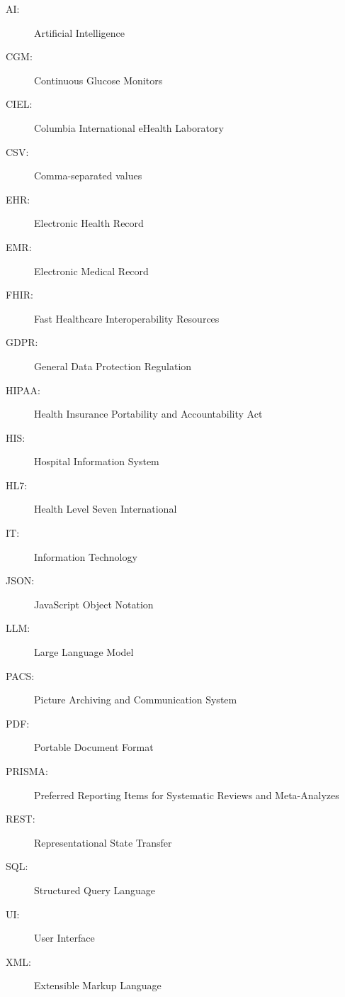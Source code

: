 \begin{description}
    \item[AI:] Artificial Intelligence
    \item[CGM:] Continuous Glucose Monitors
    \item[CIEL:] Columbia International eHealth Laboratory
    \item[CSV:] Comma-separated values 
    \item[EHR:] Electronic Health Record
    \item[EMR:] Electronic Medical Record
    \item[FHIR:] Fast Healthcare Interoperability Resources
    \item[GDPR:] General Data Protection Regulation
    \item[HIPAA:] Health Insurance Portability and Accountability Act
    \item[HIS:] Hospital Information System
    \item[HL7:] Health Level Seven International
    \item[IT:] Information Technology
    \item[JSON:] JavaScript Object Notation
    \item[LLM:] Large Language Model
    \item[PACS:] Picture Archiving and Communication System
    \item[PDF:] Portable Document Format 
    \item[PRISMA:] Preferred Reporting Items for Systematic Reviews and Meta-Analyzes
    \item[REST:] Representational State Transfer
    \item[SQL:] Structured Query Language
    \item[UI:] User Interface
    \item[XML:] Extensible Markup Language
\end{description}